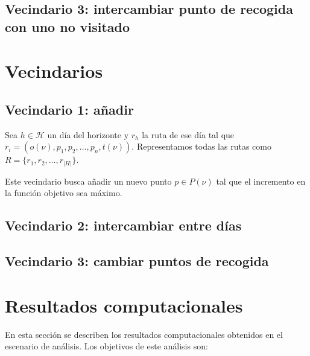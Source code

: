\documentclass[
]{article}
\begin{document}
\hypertarget{vecindario-3-intercambiar-punto-de-recogida-con-uno-no-visitado}{%
\subsection{Vecindario 3: intercambiar punto de recogida con uno no
visitado}\label{vecindario-3-intercambiar-punto-de-recogida-con-uno-no-visitado}}

\hypertarget{vecindarios}{%
\section{Vecindarios}\label{vecindarios}}

\hypertarget{vecindario-1-auxf1adir}{%
\subsection{Vecindario 1: añadir}\label{vecindario-1-auxf1adir}}

Sea \(h\in\mathcal{H}\) un día del horizonte y \(r_h\) la ruta de ese
día tal que \(r_i=(o(\nu), p_1, p_2, \ldots, p_n, t(\nu))\).
Representamos todas las rutas como \(R=\{r_1, r_2,\ldots, r_{|H|}\}\).

Este vecindario busca añadir un nuevo punto \(p\in P(\nu)\) tal que el
incremento en la función objetivo sea máximo.

\hypertarget{vecindario-2-intercambiar-entre-duxedas}{%
\subsection{Vecindario 2: intercambiar entre
días}\label{vecindario-2-intercambiar-entre-duxedas}}

\hypertarget{vecindario-3-cambiar-puntos-de-recogida}{%
\subsection{Vecindario 3: cambiar puntos de
recogida}\label{vecindario-3-cambiar-puntos-de-recogida}}

\hypertarget{resultados-computacionales}{%
\section{Resultados computacionales}\label{resultados-computacionales}}

En esta sección se describen los resultados computacionales obtenidos en
el escenario de análisis. Los objetivos de este análisis son:
\end{document}
